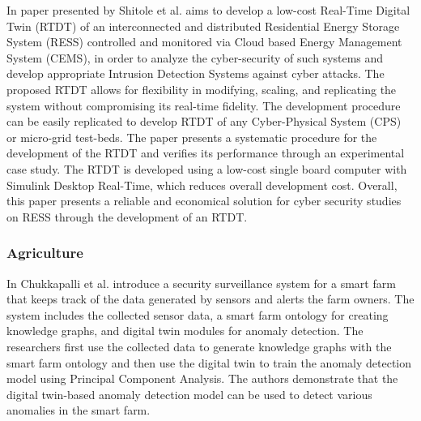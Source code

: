  In\cite{shitoleRealTimeDigitalTwin2021} paper presented by Shitole et al. aims to develop a low-cost Real-Time Digital Twin (RTDT) of an interconnected and distributed Residential Energy Storage System (RESS) controlled and monitored via Cloud based Energy Management System (CEMS), in order to analyze the cyber-security of such systems and develop appropriate Intrusion Detection Systems against cyber attacks. The proposed RTDT allows for flexibility in modifying, scaling, and replicating the system without compromising its real-time fidelity. The development procedure can be easily replicated to develop RTDT of any Cyber-Physical System (CPS) or micro-grid test-beds. The paper presents a systematic procedure for the development of the RTDT and verifies its performance through an experimental case study. The RTDT is developed using a low-cost single board computer with Simulink Desktop Real-Time, which reduces overall development cost. Overall, this paper presents a reliable and economical solution for cyber security studies on RESS through the development of an RTDT.




\subsubsection{Agriculture}
In\cite{chukkapalliCyberPhysicalSystemSecurity2021} Chukkapalli et al. introduce a security surveillance system for a smart farm that keeps track of the data generated by sensors and alerts the farm owners. The system includes the collected sensor data, a smart farm ontology for creating knowledge graphs, and digital twin modules for anomaly detection. The researchers first use the collected data to generate knowledge graphs with the smart farm ontology and then use the digital twin to train the anomaly detection model using Principal Component Analysis. The authors demonstrate that the digital twin-based anomaly detection model can be used to detect various anomalies in the smart farm.

